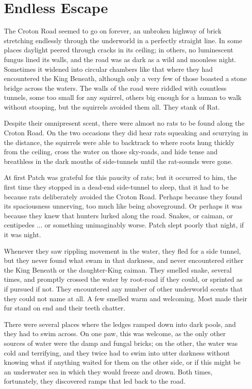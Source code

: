 \documentclass[12pt]{book}
\begin{document}
\section{Endless Escape}

 The Croton Road seemed to go on forever, an unbroken highway of brick stretching endlessly through the underworld in a perfectly straight line. In some places daylight peered through cracks in its ceiling; in others, no luminescent fungus lined its walls, and the road was as dark as a wild and moonless night. Sometimes it widened into circular chambers like that where they had encountered the King Beneath, although only a very few of those boasted a stone bridge across the waters. The walls of the road were riddled with countless tunnels, some too small for any squirrel, others big enough for a human to walk without stooping, but the squirrels avoided them all. They stank of Rat.\par
 Despite their omnipresent scent, there were almost no rats to be found along the Croton Road. On the two occasions they did hear rats squeaking and scurrying in the distance, the squirrels were able to backtrack to where roots hung thickly from the ceiling, cross the water on those sky-roads, and hide tense and breathless in the dark mouths of side-tunnels until the rat-sounds were gone.\par
At first Patch was grateful for this paucity of rats; but it occurred to him, the first time they stopped in a dead-end side-tunnel to sleep, that it had to be because rats deliberately avoided the Croton Road. Perhaps because they found its spaciousness unnerving, too much like being aboveground. Or perhaps it was because they knew that hunters lurked along the road. Snakes, or caiman, or centipedes ... or something unimaginably worse. Patch slept poorly that night, if it was night.\par
Whenever they saw rippling movement in the water, they fled for a side tunnel, but they never found what swam in that darkness, and never encountered either the King Beneath or the daughter-King caiman. They smelled snake, several times, and promptly crossed the water by root-road if they could, or sprinted as if pursued if not. They encountered any number of other underworld scents that they could not name at all. A few smelled warm and welcoming. Most made their fur stand on end and their teeth chatter.\par
There were several places where the ledges ramped down into dark pools, and they had to swim across. On one paw, this was welcome, as the only other sources of water were the damp and fungal bricks; on the other, the water was cold and terrifying, and they twice had to swim into utter darkness without knowing what if anything waited for them on the other side, or if this might be an underwater sea in which they would freeze and drown. Both times, fortunately, they discovered ramps that led back to the road.\par
\end{document}
